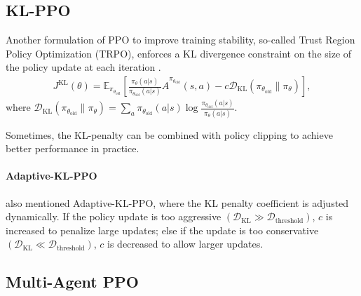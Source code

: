 \documentclass{article} %
\begin{document}
\subsection{KL-PPO}

Another formulation of PPO to improve training stability, so-called Trust Region Policy Optimization (TRPO), enforces a KL divergence constraint on the size of the policy update at each iteration \cite{schulman2017proximalpolicyoptimizationalgorithms}.
\begin{equation} \label{alg:TRPO}
\begin{gathered}
    J^{\text{KL}}(\theta) = \mathbb{E}_{\pi_{\theta_{\text{old}}}} \left[ \frac{\pi_{\theta}(a|s)}{\pi_{\theta_{\text{old}}}(a|s)} \hat{A}^{\pi_{\theta_{\text{old}}}}(s, a)-c
     \mathcal{D}_\text{KL}(\pi_{\theta_{\text{old}}} \| \pi_{\theta}) \right],
    \end{gathered}
\end{equation}
where $\mathcal{D}_\text{KL}(\pi_{\theta_{\text{old}}} \| \pi_{\theta}) = \sum_{a} \pi_{\theta_{\text{old}}}(a | s) \log \frac{\pi_{\theta_{\text{old}}}(a | s)}{\pi_{\theta}(a| s)}$.

Sometimes, the KL-penalty can be combined with policy clipping to achieve better performance in practice.

\paragraph{Adaptive-KL-PPO} \cite{schulman2017proximalpolicyoptimizationalgorithms} also mentioned Adaptive-KL-PPO, where the KL penalty coefficient is adjusted dynamically. If the policy update is too aggressive $\left( \mathcal{D}_\text{KL} \gg \mathcal{D}_\text{threshold} \right)$, $c$ is increased to penalize large updates; else if the update is too conservative $\left( \mathcal{D}_\text{KL} \ll \mathcal{D}_\text{threshold} \right)$, $c$ is decreased to allow larger updates.

\subsection{Multi-Agent PPO}
\end{document}
